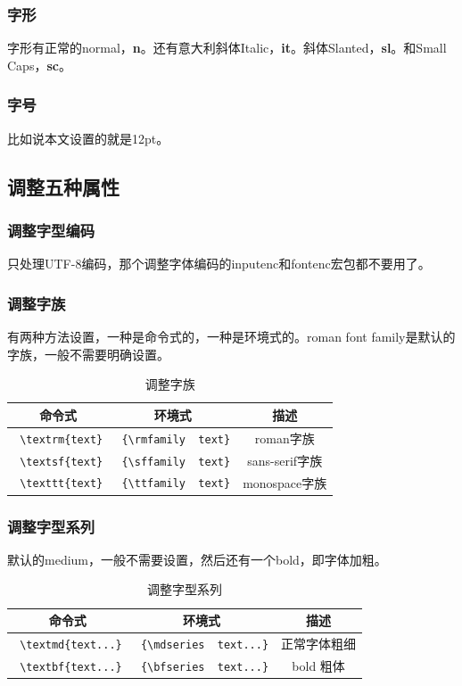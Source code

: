 \documentclass[12pt,oneside]{book}
\begin{document}
\begin{common-format}
\subsubsection{字形}
字形有正常的normal，\textbf{n}。还有意大利斜体Italic，\textbf{it}。斜体Slanted，\textbf{sl}。和Small Caps，\textbf{sc}。


\subsubsection{字号}
比如说本文设置的就是12pt。



\subsection{调整五种属性}
\subsubsection{调整字型编码}
\XeLaTeX 只处理UTF-8编码，那个调整字体编码的inputenc和fontenc宏包都不要用了。


\subsubsection{调整字族}
有两种方法设置，一种是命令式的，一种是环境式的。roman font family是默认的字族，一般不需要明确设置。
\begin{table}[H]
\centering
\label{tab:调整字族}
\begin{tabular}{|c|c|c|}
\hline
命令式 & 环境式 & 描述 \\
\hline
\verb+ \textrm{text}+ & \verb+ {\rmfamily  text}+  & roman字族 \\
\verb+ \textsf{text}+ & \verb+ {\sffamily  text}+  & sans-serif字族 \\
\verb+ \texttt{text}+ & \verb+ {\ttfamily  text}+  & monospace字族 \\
\hline
\end{tabular}
\caption{调整字族}
\end{table}

\subsubsection{调整字型系列}
默认的medium，一般不需要设置，然后还有一个bold，即字体加粗。
\begin{table}[H]
\centering
\label{tab:调整字型系列}
\begin{tabular}{|c|c|c|}
\hline
命令式 & 环境式 & 描述 \\
\hline
\verb+ \textmd{text...}+ & \verb+ {\mdseries  text...}+  & 正常字体粗细 \\  
\verb+ \textbf{text...}+ & \verb+ {\bfseries  text...}+  & bold 粗体 \\
\hline
\end{tabular}
\caption{调整字型系列}
\end{table}



\end{common-format}
\end{document}
